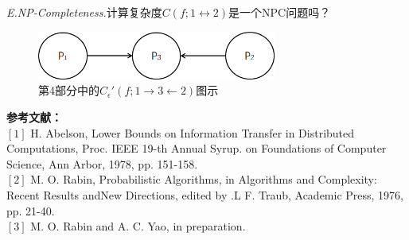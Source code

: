 \documentclass[]{article}
\begin{document}
	\textit{E.NP-Completeness.}计算复杂度$C(f;1\leftrightarrow 2)$是一个NPC问题吗？
	
		\begin{figure}[htbp]
		\centering
		\includegraphics[width=0.7\textwidth]{Fig3.png}
		\caption{第4部分中的$C_{\epsilon}'(f;1\rightarrow 3 \leftarrow 2)$图示}
		\label{Fig3}
	\end{figure}

	
	\vspace{1cm}
	\textbf{参考文献：}\\
	$\left[ 1 \right]$ H. Abelson, Lower Bounds on Information Transfer in Distributed
	Computations, Proc. IEEE 19-th Annual Syrup. on Foundations
	of Computer Science, Ann Arbor, 1978, pp. 151-158.\\
	$\left[ 2 \right]$ M. O. Rabin, Probabilistic Algorithms, in Algorithms and Complexity:
	Recent Results andNew Directions, edited by .L F. Traub, Academic
	Press, 1976, pp. 21-40.\\
	$\left[ 3 \right]$ M. O. Rabin and A. C. Yao, in preparation.
	\par
\end{document}

